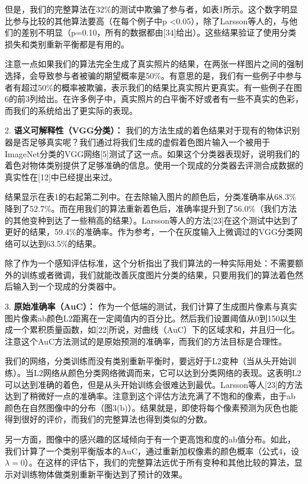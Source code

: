 但是，我们的完整算法在32\%的测试中欺骗了参与者，如表1所示。这个数字明显比参与比较的其他算法要高（在每个例子中p <0.05），除了Larsson等人的，与他们的差别不明显（p=0.10，所有的数据都由[34]给出）。这些结果验证了使用分类损失和类别重新平衡都是有用的。

注意一点如果我们的算法完全生成了真实照片的结果，在两张一样图片之间的强制选择，会导致参与者被骗的期望概率是50\%。有意思的是，我们有一些例子中参与者有超过50\%的概率被欺骗，表示我们的结果比真实照片更真实。有一些例子在图6的前3列给出。在许多例子中，真实照片的白平衡不好或者有一些不真实的色彩，而我们的系统给出了更实际的表现。

2. \textbf{语义可解释性（VGG分类）： } 我们的方法生成的着色结果对于现有的物体识别器是否足够真实呢？我们通过将我们生成的虚假着色图片输入一个被用于ImageNet分类的VGG网络[5]测试了这一点。如果这个分类器表现好，说明我们的着色对物体类别提供了足够准确的信息。使用一个现成的分类器去评测合成数据的真实性在[12]中已经提出来过。

结果显示在表1的右起第二列中。在去除输入图片的颜色后，分类准确率从68.3\%降到了52.7\%。而在用我们的算法重新着色后，准确率提升到了56.0\%（我们方法的其他变种到达了一些稍高的结果）。Larsson等人的方法[23]在这个测试中达到了更好的结果，59.4\%的准确率。作为参考，一个在灰度输入上微调过的VGG分类网络可以达到63.5\%的结果。

除了作为一个感知评估标准，这个分析指出了我们算法的一种实际用处：不需要额外的训练或者微调，我们就能改善灰度图片分类的结果，只要用我们的算法着色然后输入到一个现成的分类器中。

3. \textbf{原始准确率（AuC）： } 作为一个低端的测试，我们计算了生成图片像素与真实图片像素ab颜色L2距离在一定阈值内的百分比。然后我们设置阈值从0到150以生成一个累积质量函数，如[22]所说，对曲线（AuC）下的区域求和，并且归一化。注意这个AuC方法测试的是原始预测的准确率，而我们的方法目标是合理性。

我们的网络，分类训练而没有类别重新平衡时，要远好于L2变种（当从头开始训练）。当L2网络从颜色分类网络微调而来，它可以达到分类网络的表现。这表明L2可以达到准确的着色，但是从头开始训练会很难达到最优。Larsson等人[23]的方法达到了稍微好一点的准确率。注意到这个评估方法充满了不饱和的像素，由于ab颜色在自然图像中的分布（图3(b)）。结果就是，即使将每个像素预测为灰色也能得到很好的评价，而我们的完整算法也得到类似的分数。

另一方面，图像中的感兴趣的区域倾向于有一个更高饱和度的ab值分布。如此，我们计算了一个类别平衡版本的AuC，通过重新加权像素的颜色概率（公式4，设$\lambda = 0$）。在这样的评估下，我们的完整算法远优于所有变种和其他比较的算法，显示对训练物体做类别重新平衡达到了预计的效果。

